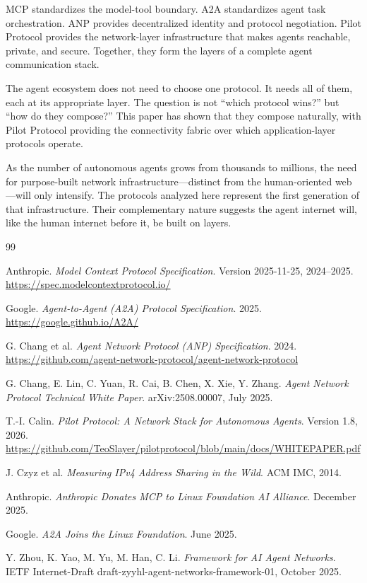 \documentclass[11pt,a4paper]{article}
\begin{document}
MCP standardizes the model-tool boundary. A2A standardizes agent task orchestration. ANP provides decentralized identity and protocol negotiation. Pilot Protocol provides the network-layer infrastructure that makes agents reachable, private, and secure. Together, they form the layers of a complete agent communication stack.

The agent ecosystem does not need to choose one protocol. It needs all of them, each at its appropriate layer. The question is not ``which protocol wins?'' but ``how do they compose?'' This paper has shown that they compose naturally, with Pilot Protocol providing the connectivity fabric over which application-layer protocols operate.

As the number of autonomous agents grows from thousands to millions, the need for purpose-built network infrastructure---distinct from the human-oriented web---will only intensify. The protocols analyzed here represent the first generation of that infrastructure. Their complementary nature suggests the agent internet will, like the human internet before it, be built on layers.

\begin{thebibliography}{99}

Anthropic.
\textit{Model Context Protocol Specification}.
Version 2025-11-25, 2024--2025.
\url{https://spec.modelcontextprotocol.io/}

Google.
\textit{Agent-to-Agent (A2A) Protocol Specification}.
2025.
\url{https://google.github.io/A2A/}

G. Chang et al.
\textit{Agent Network Protocol (ANP) Specification}.
2024.
\url{https://github.com/agent-network-protocol/agent-network-protocol}

G. Chang, E. Lin, C. Yuan, R. Cai, B. Chen, X. Xie, Y. Zhang.
\textit{Agent Network Protocol Technical White Paper}.
arXiv:2508.00007, July 2025.

T.-I. Calin.
\textit{Pilot Protocol: A Network Stack for Autonomous Agents}.
Version 1.8, 2026.
\url{https://github.com/TeoSlayer/pilotprotocol/blob/main/docs/WHITEPAPER.pdf}

J. Czyz et al.
\textit{Measuring IPv4 Address Sharing in the Wild}.
ACM IMC, 2014.

Anthropic.
\textit{Anthropic Donates MCP to Linux Foundation AI Alliance}.
December 2025.

Google.
\textit{A2A Joins the Linux Foundation}.
June 2025.

Y. Zhou, K. Yao, M. Yu, M. Han, C. Li.
\textit{Framework for AI Agent Networks}.
IETF Internet-Draft draft-zyyhl-agent-networks-framework-01, October 2025.

\end{thebibliography}
\end{document}

